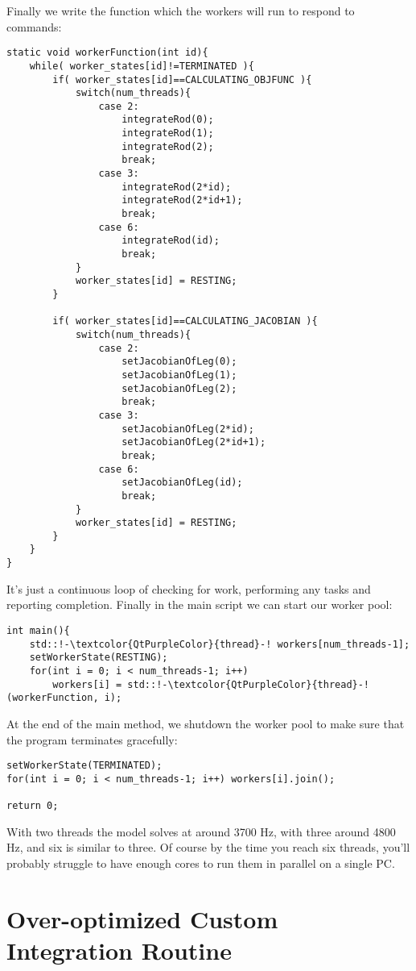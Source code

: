 \documentclass[12pt]{article}
\begin{document}
Finally we write the function which the workers will run to respond to commands:
\begin{lstlisting}
static void workerFunction(int id){
    while( worker_states[id]!=TERMINATED ){
        if( worker_states[id]==CALCULATING_OBJFUNC ){
            switch(num_threads){
                case 2:
                    integrateRod(0);
                    integrateRod(1);
                    integrateRod(2);
                    break;
                case 3:
                    integrateRod(2*id);
                    integrateRod(2*id+1);
                    break;
                case 6:
                    integrateRod(id);
                    break;
            }
            worker_states[id] = RESTING;
        }

        if( worker_states[id]==CALCULATING_JACOBIAN ){
            switch(num_threads){
                case 2:
                    setJacobianOfLeg(0);
                    setJacobianOfLeg(1);
                    setJacobianOfLeg(2);
                    break;
                case 3:
                    setJacobianOfLeg(2*id);
                    setJacobianOfLeg(2*id+1);
                    break;
                case 6:
                    setJacobianOfLeg(id);
                    break;
            }
            worker_states[id] = RESTING;
        }
    }
}
\end{lstlisting}
It's just a continuous loop of checking for work, performing any tasks and reporting completion. Finally in the main script we can start our worker pool:
\begin{lstlisting}
int main(){
    std::!-\textcolor{QtPurpleColor}{thread}-! workers[num_threads-1];
    setWorkerState(RESTING);
    for(int i = 0; i < num_threads-1; i++)
        workers[i] = std::!-\textcolor{QtPurpleColor}{thread}-!(workerFunction, i);
\end{lstlisting}
At the end of the main method, we shutdown the worker pool to make sure that the program terminates gracefully:
\begin{lstlisting}
setWorkerState(TERMINATED);
for(int i = 0; i < num_threads-1; i++) workers[i].join();

return 0;
\end{lstlisting}
With two threads the model solves at around 3700 Hz, with three around 4800 Hz, and six is similar to three. Of course by the time you reach six threads, you'll probably struggle to have enough cores to run them in parallel on a single PC.

\section{Over-optimized Custom Integration Routine}
\end{document}
